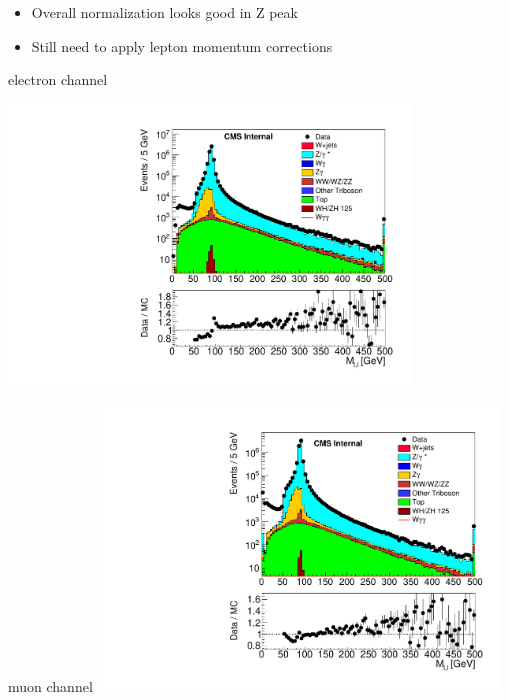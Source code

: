 \documentclass{beamer}
\begin{document}
 {

    \begin{itemize}
        \item Overall normalization looks good in Z peak
        \item Still need to apply lepton momentum corrections
    \end{itemize}

    \bc
     
         electron channel
             
         \includegraphics[width=0.8\textwidth]{Plots/m_leplep_2el.pdf}



         muon channel
        \includegraphics[width=0.8\textwidth]{Plots/m_leplep_2mu.pdf}

    \ec
}
\end{document}
